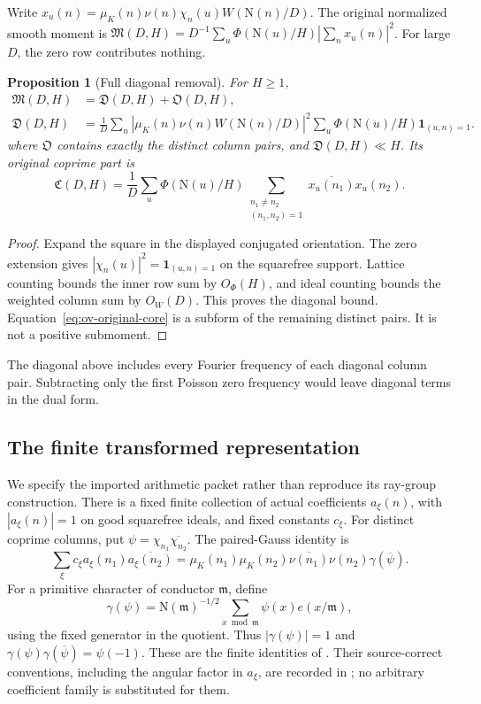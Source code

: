 \documentclass[11pt]{article}
\numberwithin{equation}{section}
\newtheorem{proposition}[theorem]{Proposition}
\theoremstyle{definition}
\theoremstyle{remark}
\newcommand{\N}{\mathrm N}
\newcommand{\muK}{\mu_K}
\newcommand{\ind}{\mathbf 1}
\newcommand{\Mfrak}{\mathfrak M}
\begin{document}
Write \(x_u(n)=\muK(n)\nu(n)\chi_n(u)W(\N(n)/D)\).
The original normalized smooth moment is
\(\Mfrak(D,H)=D^{-1}\sum_u\Phi(\N(u)/H)|\sum_nx_u(n)|^2\).
For large \(D\), the zero row contributes nothing.

\begin{proposition}[Full diagonal removal]\label{prop:ov-diagonal}
For \(H\ge1\),
\begin{align*}
 \Mfrak(D,H)&=\mathfrak D(D,H)+\mathfrak O(D,H),\\
 \mathfrak D(D,H)&=\frac1D\sum_n|\muK(n)\nu(n)W(\N(n)/D)|^2
       \sum_u\Phi(\N(u)/H)\ind_{(u,n)=1}.
\end{align*}
where \(\mathfrak O\) contains exactly the distinct column pairs, and
\(\mathfrak D(D,H)\ll H\). Its original coprime part is
\begin{equation}\label{eq:ov-original-core}
 \mathfrak C(D,H)=\frac1D\sum_u\Phi(\N(u)/H)
   \sum_{\substack{n_1\ne n_2\\(n_1,n_2)=1}}
               \overline{x_u(n_1)}x_u(n_2).
\end{equation}
\end{proposition}
\begin{proof}
Expand the square in the displayed conjugated orientation.
The zero extension gives \(|\chi_n(u)|^2=\ind_{(u,n)=1}\)
on the squarefree support. Lattice counting bounds the inner row
sum by \(O_\Phi(H)\), and ideal counting bounds the weighted column
sum by \(O_W(D)\). This proves the diagonal bound.
Equation~\eqref{eq:ov-original-core} is a subform of the remaining
distinct pairs. It is not a positive submoment.
\end{proof}

The diagonal above includes every Fourier frequency of each diagonal
column pair. Subtracting only the first Poisson zero frequency would
leave diagonal terms in the dual form.

\subsection{The finite transformed representation}

We specify the imported arithmetic packet rather than reproduce its
ray-group construction. There is a fixed finite collection of actual
coefficients \(a_\xi(n)\), with \(|a_\xi(n)|=1\) on good squarefree
ideals, and fixed constants \(c_\xi\). For distinct coprime columns,
put \(\psi=\chi_{n_1}\overline{\chi_{n_2}}\). The paired-Gauss identity is
\begin{equation}\label{eq:ov-paired-gauss}
 \sum_\xi c_\xi a_\xi(n_1)\overline{a_\xi(n_2)}
 =\muK(n_1)\muK(n_2)\overline{\nu(n_1)}\nu(n_2)
                                      \gamma(\overline\psi).
\end{equation}
For a primitive character of conductor \(\mathfrak m\), define
\[
 \gamma(\psi)=\N(\mathfrak m)^{-1/2}
      \sum_{x\bmod\mathfrak m}\psi(x)e(x/\mathfrak m),
\]
using the fixed generator in the quotient. Thus
\(|\gamma(\psi)|=1\) and
\(\gamma(\psi)\gamma(\overline\psi)=\psi(-1)\).
These are the finite identities of \cite[Lemma~4.1]{OA5}.
Their source-correct conventions, including the angular factor in
\(a_\xi\), are recorded in \cite{N3}; no arbitrary coefficient family
is substituted for them.
\end{document}
